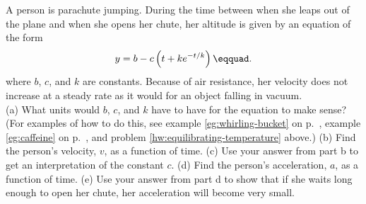  A person is parachute jumping. During the
time between when she leaps out of the plane and when she
opens her chute, her altitude is given by an equation of the form
\begin{equation*}
      y = b - c\left(t+ke^{-t/k}\right)\eqquad.
\end{equation*}
where  $b$, $c$, and
$k$ are constants. Because of air resistance, her velocity
does not increase at a steady rate as it would for an
object falling in vacuum.\\
(a) What units would $b$, $c$, and $k$ have to have for the
equation to make sense? (For examples of how to do this, see
example \ref{eg:whirling-bucket} on p.~\pageref{eg:whirling-bucket},
example \ref{eg:caffeine} on p.~\pageref{eg:caffeine},
and problem \ref{hw:equilibrating-temperature} above.)\hwendpart
(b) Find the person's velocity, $v$, as a function of time.\answercheck\hwendpart
(c) Use your answer from part b to get an interpretation
of the constant $c$.\hwendpart
(d) Find the person's acceleration, $a$, as a function of time.\answercheck\hwendpart
(e) Use your answer from part d to show that if she waits
long enough to open her chute, her acceleration will become very small.
